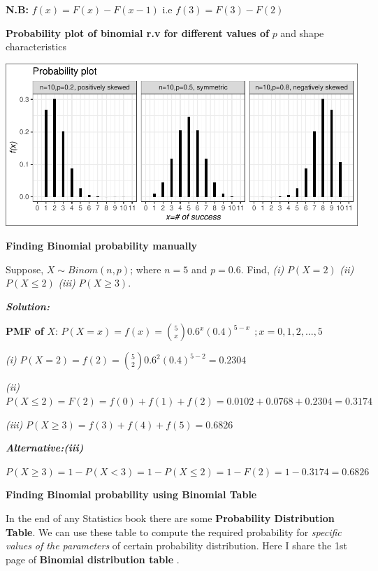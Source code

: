 \documentclass[
]{article}
\begin{document}
\textbf{N.B:} \(f(x)=F(x)-F(x-1)\) i.e \(f(3)=F(3)-F(2)\)

\textbf{Probability plot of binomial r.v for different values of} \(p\) and shape characteristics

\includegraphics{_main_files/figure-latex/unnamed-chunk-1-1.pdf}

\textbf{Finding Binomial probability manually}

Suppose, \(X\sim Binom(n,p)\); where \(n=5\) and \(p=0.6\). Find, \emph{(i)} \(P(X=2)\) \emph{(ii)} \(P(X \le 2)\) \emph{(iii)} \(P(X\ge3)\).

\textbf{\emph{Solution:}}

\textbf{PMF of} \(X\): \(P(X=x)=f(x)=\binom{5}{x} 0.6^x (0.4)^{5-x} \ \ ;x=0,1,2,...,5\)

\emph{(i)} \(P(X=2)=f(2)=\binom{5}{2} 0.6^2 (0.4)^{5-2}=0.2304\)

\emph{(ii)} \(P(X \le 2)=F(2)=f(0)+f(1)+f(2)=0.0102+0.0768+0.2304=0.3174\)

\emph{(iii)} \(P(X \ge 3)=f(3)+f(4)+f(5)=0.6826\)

\textbf{\emph{Alternative:(iii)}}

\(P(X \ge 3)=1-P(X< 3)=1-P(X \le 2)=1-F(2)=1-0.3174=0.6826\)

\textbf{Finding Binomial probability using Binomial Table}

In the end of any Statistics book there are some \textbf{Probability Distribution Table}. We can use these table to compute the required probability for \emph{specific values of the parameters} of certain probability distribution. Here I share the 1st page of \textbf{Binomial distribution table} \citep{baron_probability_2019}.
\end{document}
